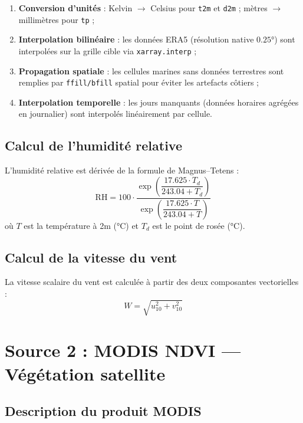 \documentclass[12pt,a4paper]{report}
\begin{document}
\begin{enumerate}[leftmargin=*]
  \item \textbf{Conversion d'unités} : Kelvin $\to$ Celsius pour \texttt{t2m} et
        \texttt{d2m} ; mètres $\to$ millimètres pour \texttt{tp} ;
  \item \textbf{Interpolation bilinéaire} : les données ERA5 (résolution native $0.25°$)
        sont interpolées sur la grille cible via \texttt{xarray.interp} ;
  \item \textbf{Propagation spatiale} : les cellules marines sans données terrestres
        sont remplies par \texttt{ffill/bfill} spatial pour éviter les artefacts côtiers ;
  \item \textbf{Interpolation temporelle} : les jours manquants (données horaires
        agrégées en journalier) sont interpolés linéairement par cellule.
\end{enumerate}

\subsection{Calcul de l'humidité relative}

L'humidité relative est dérivée de la formule de Magnus--Tetens :
\begin{equation}
  \text{RH} = 100 \cdot \frac{\exp\!\left(\dfrac{17.625 \cdot T_d}{243.04 + T_d}\right)}
                              {\exp\!\left(\dfrac{17.625 \cdot T}{243.04 + T}\right)}
  \label{eq:rh}
\end{equation}
où $T$ est la température à 2m (°C) et $T_d$ est le point de rosée (°C).

\subsection{Calcul de la vitesse du vent}

La vitesse scalaire du vent est calculée à partir des deux composantes vectorielles :
\begin{equation}
  W = \sqrt{u_{10}^2 + v_{10}^2}
  \label{eq:wind}
\end{equation}

\section{Source 2 : MODIS NDVI — Végétation satellite}

\subsection{Description du produit MODIS}
\end{document}

